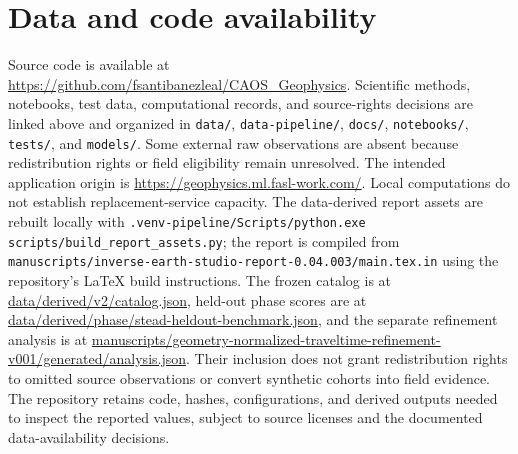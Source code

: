 \section{Data and code availability}\label{data-and-code-availability}

Source code is available at
\url{https://github.com/fsantibanezleal/CAOS_Geophysics}. Scientific
methods, notebooks, test data, computational records, and source-rights
decisions are linked above and organized in \texttt{data/},
\texttt{data-pipeline/}, \texttt{docs/}, \texttt{notebooks/},
\texttt{tests/}, and \texttt{models/}. Some external raw observations
are absent because redistribution rights or field eligibility remain
unresolved. The intended application origin is
\url{https://geophysics.ml.fasl-work.com/}. Local computations do not
establish replacement-service capacity.
The data-derived report assets are rebuilt locally with
\texttt{.venv-pipeline/Scripts/python.exe scripts/build\_report\_assets.py};
the report is compiled from
\texttt{manuscripts/inverse-earth-studio-report-0.04.003/main.tex.in}
using the repository's LaTeX build instructions. The frozen catalog is
at \url{data/derived/v2/catalog.json}, held-out phase scores are at
\url{data/derived/phase/stead-heldout-benchmark.json}, and the
separate refinement analysis is at
\url{manuscripts/geometry-normalized-traveltime-refinement-v001/generated/analysis.json}.
Their inclusion does not grant redistribution rights to omitted source
observations or convert synthetic cohorts into field evidence. The
repository retains code, hashes, configurations, and derived outputs
needed to inspect the reported values, subject to source licenses and
the documented data-availability decisions.
